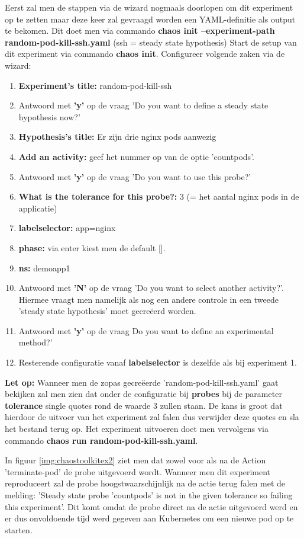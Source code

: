 Eerst zal men de stappen via de wizard nogmaals doorlopen om dit experiment op te zetten maar deze keer zal gevraagd worden een YAML-definitie als output te bekomen. Dit doet men via commando {\bf chaos init --experiment-path random-pod-kill-ssh.yaml} (ssh = steady state hypothesis)
Start de setup van dit experiment via commando {\bf chaos init}. Configureer volgende zaken via de wizard:
\begin{enumerate}
    \item {\bf Experiment's title:} random-pod-kill-ssh
    \item Antwoord met {\bf 'y'} op de vraag 'Do you want to define a steady state hypothesis now?'
    \item {\bf Hypothesis's title:} Er zijn drie nginx pods aanwezig
    \item {\bf Add an activity:} geef het nummer op van de optie 'count\textunderscore pods'.
    \item Antwoord met {\bf 'y'} op de vraag 'Do you want to use this probe?'
    \item {\bf What is the tolerance for this probe?:} 3 (= het aantal nginx pods in de applicatie)
    \item {\bf label\textunderscore selector:} app=nginx
    \item {\bf phase:} via enter kiest men de default [].
    \item {\bf ns:} demoapp1
    \item Antwoord met {\bf 'N'} op de vraag 'Do you want to select another activity?'. Hiermee vraagt men namelijk als nog een andere controle in een tweede 'steady state hypothesis' moet gecreëerd worden. 
    \item Antwoord met {\bf 'y'} op de vraag Do you want to define an experimental method?'
    \item Resterende configuratie vanaf {\bf label\textunderscore selector} is dezelfde als bij experiment 1.
\end{enumerate}

{\bf Let op:} Wanneer men de zopas gecreëerde 'random-pod-kill-ssh.yaml' gaat bekijken zal men zien dat onder de configuratie bij {\bf probes} bij de parameter {\bf tolerance} single quotes rond de waarde 3 zullen staan. De kans is groot dat hierdoor de uitvoer van het experiment zal falen dus verwijder deze quotes en sla het bestand terug op. Het experiment uitvoeren doet men vervolgens via commando {\bf chaos run random-pod-kill-ssh.yaml}.
  
In figuur \ref{img:chaostoolkitex2} ziet men dat zowel voor als na de Action 'terminate-pod' de probe uitgevoerd wordt. Wanneer men dit experiment reproduceert zal de probe hoogstwaarschijnlijk na de actie terug falen met de melding: 'Steady state probe 'count\textunderscore pods' is not in the given tolerance so failing this experiment'.
\newline Dit komt omdat de probe direct na de actie uitgevoerd werd en er dus onvoldoende tijd werd gegeven aan Kubernetes om een nieuwe pod op te starten.

